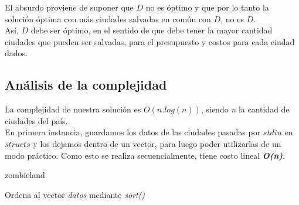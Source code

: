 El absurdo proviene de suponer que $D$ no es óptimo y que por lo tanto la solución óptima con más ciudades salvadas en común con $D$, no es $D$.\\

Así, $D$ debe ser óptimo, en el sentido de que debe tener la mayor cantidad ciudades que pueden ser salvadas, para el presupuesto y costos para cada ciudad dados.

\newpage
\subsection{An\'alisis de la complejidad}
La complejidad de nuestra soluci\'on es $O(n.log(n))$, siendo \emph{n} la cantidad de ciudades del pa\'is.\\

En primera instancia, guardamos los datos de las ciudades pasadas por $stdin$ en $structs$ y los dejamos dentro de un vector, para luego poder utilizarlas de un modo pr\'actico. Como esto se realiza secuencialmente, tiene costo lineal \textbf{\textit{O(n)}}.

\begin{algorithm}[h!]
\caption{zombieland}
Ordena al vector \emph{datos} mediante \textit{sort()}\\
\end{algorithm}

